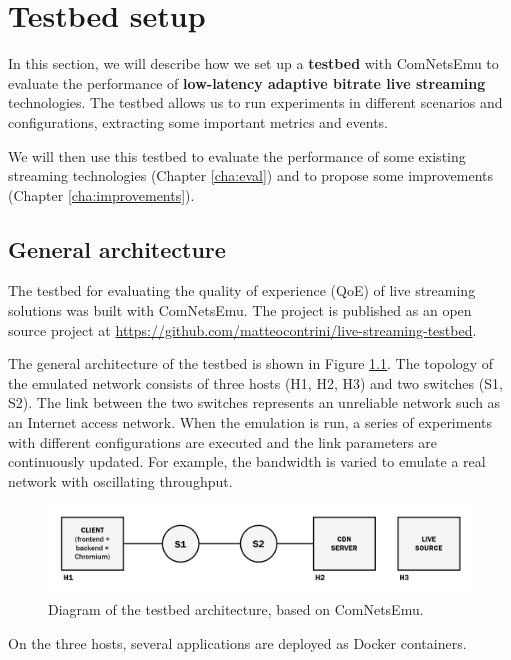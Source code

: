 \chapter{Testbed setup}
\label{cha:testbed}

In this section, we will describe how we set up a \textbf{testbed} with ComNetsEmu to evaluate the performance of \textbf{low-latency adaptive bitrate live streaming} technologies. The testbed allows us to run experiments in different scenarios and configurations, extracting some important metrics and events.

We will then use this testbed to evaluate the performance of some existing streaming technologies (Chapter \ref{cha:eval}) and to propose some improvements (Chapter \ref{cha:improvements}).

\section{General architecture}
\label{sec:testbed/architecture}

The testbed for evaluating the quality of experience (QoE) of live streaming solutions was built with ComNetsEmu. The project is published as an open source project at \url{https://github.com/matteocontrini/live-streaming-testbed}.

The general architecture of the testbed is shown in Figure \ref{fig:testbed}. The topology of the emulated network consists of three hosts (H1, H2, H3) and two switches (S1, S2). The link between the two switches represents an unreliable network such as an Internet access network. When the emulation is run, a series of experiments with different configurations are executed and the link parameters are continuously updated. For example, the bandwidth is varied to emulate a real network with oscillating throughput.

\begin{figure}[h]
    \centering
    \includegraphics[width=\textwidth]{res/testbed.png}
    \caption{Diagram of the testbed architecture, based on ComNetsEmu.}
    \label{fig:testbed}
\end{figure}

On the three hosts, several applications are deployed as Docker containers.

